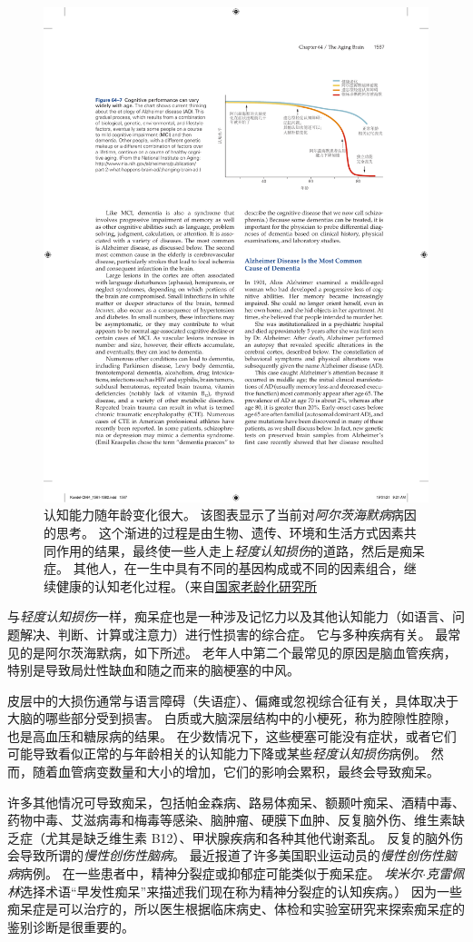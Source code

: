 \begin{figure}[htbp]
	\centering
	\includegraphics[width=0.7\linewidth]{chap64/fig_64_7}
	\caption{认知能力随年龄变化很大。
		该图表显示了当前对\textit{阿尔茨海默病}病因的思考。
		这个渐进的过程是由生物、遗传、环境和生活方式因素共同作用的结果，最终使一些人走上\textit{轻度认知损伤}的道路，然后是痴呆症。
		其他人，在一生中具有不同的基因构成或不同的因素组合，继续健康的认知老化过程。（来自\href{http://www.nia.nih.gov/alzheimers/publication/part-2-what-happens-brain-ad/changing-brain-ad}{国家老龄化研究所}}
	\label{fig:64_7}
\end{figure}


与\textit{轻度认知损伤}一样，痴呆症也是一种涉及记忆力以及其他认知能力（如语言、问题解决、判断、计算或注意力）进行性损害的综合症。
它与多种疾病有关。
最常见的是阿尔茨海默病，如下所述。
老年人中第二个最常见的原因是脑血管疾病，特别是导致局灶性缺血和随之而来的脑梗塞的中风。


皮层中的大损伤通常与语言障碍（失语症）、偏瘫或忽视综合征有关，具体取决于大脑的哪些部分受到损害。
白质或大脑深层结构中的小梗死，称为腔隙性腔隙，也是高血压和糖尿病的结果。
在少数情况下，这些梗塞可能没有症状，或者它们可能导致看似正常的与年龄相关的认知能力下降或某些\textit{轻度认知损伤}病例。
然而，随着血管病变数量和大小的增加，它们的影响会累积，最终会导致痴呆。


许多其他情况可导致痴呆，包括帕金森病、路易体痴呆、额颞叶痴呆、酒精中毒、药物中毒、艾滋病毒和梅毒等感染、脑肿瘤、硬膜下血肿、反复脑外伤、维生素缺乏症（尤其是缺乏维生素 B12）、甲状腺疾病和各种其他代谢紊乱。
反复的脑外伤会导致所谓的\textit{慢性创伤性脑病}。
最近报道了许多美国职业运动员的\textit{慢性创伤性脑病}病例。
在一些患者中，精神分裂症或抑郁症可能类似于痴呆症。
\textit{埃米尔$\cdot$克雷佩林}选择术语“早发性痴呆”来描述我们现在称为精神分裂症的认知疾病。）
因为一些痴呆症是可以治疗的，所以医生根据临床病史、体检和实验室研究来探索痴呆症的鉴别诊断是很重要的。



